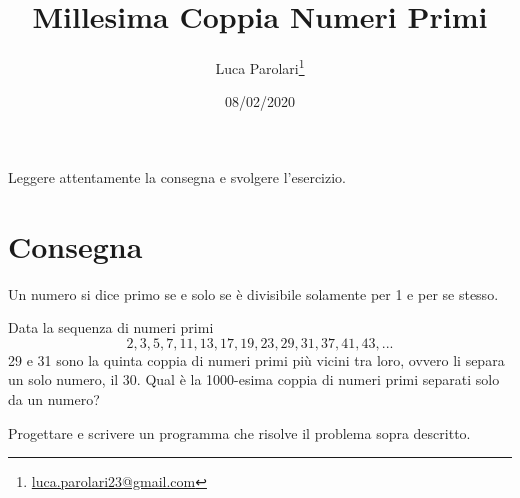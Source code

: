 \documentclass[addpoints,12pt,answers]{exam}
\author{Luca Parolari\footnote{\href{mailto:luca.parolari23@gmail.com}{luca.parolari23@gmail.com}}}
\begin{document}
    
    \title{Millesima Coppia Numeri Primi}
    \date{08/02/2020}
    
    \maketitle
    
    Leggere attentamente la consegna e svolgere l'esercizio.
    
    \section{Consegna}
    Un numero si dice primo se e solo se è divisibile solamente per 1 e per se stesso.

    Data la sequenza di numeri primi
    \[ 
        2, 3, 5, 7, 11, 13, 17, 19, 23, 29, 31, 37, 41, 43, ...
    \]
    29 e 31 sono la quinta coppia di numeri primi più vicini tra loro, ovvero li separa un solo numero, il 30.
    Qual è la 1000-esima coppia di numeri primi separati solo da un numero?
    
    Progettare e scrivere un programma che risolve il problema sopra descritto.
    
\end{document}
